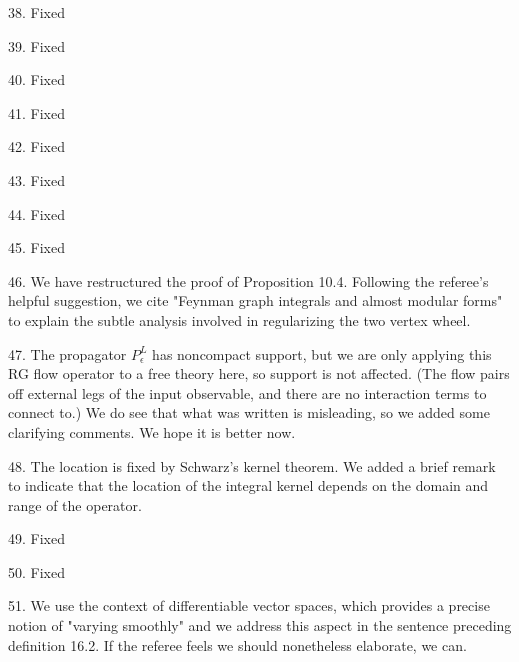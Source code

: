 \documentclass[10pt]{amsart}
\begin{document}
38. Fixed

39. Fixed

40. Fixed

41. Fixed

42. Fixed

43. Fixed

44. Fixed

45. Fixed

46. We have restructured the proof of Proposition 10.4.
Following the referee's helpful suggestion, we cite "Feynman graph integrals and almost modular forms" to explain the subtle analysis involved in regularizing the two vertex wheel.

47. The propagator $P^L_\epsilon$ has noncompact support, but we are only applying this RG flow operator to a free theory here, so support is not affected. (The flow pairs off external legs of the input observable, and there are no interaction terms to connect to.) We do see that what was written is misleading, so we added some clarifying comments. We hope it is better now.

48. The location is fixed by Schwarz's kernel theorem. We added a brief remark to indicate that the location of the integral kernel depends on the domain and range of the operator.

49. Fixed

50. Fixed

51. We use the context of differentiable vector spaces, which provides a precise notion of "varying smoothly" and we address this aspect in the sentence preceding definition 16.2. If the referee feels we should nonetheless elaborate, we can.
\end{document}
